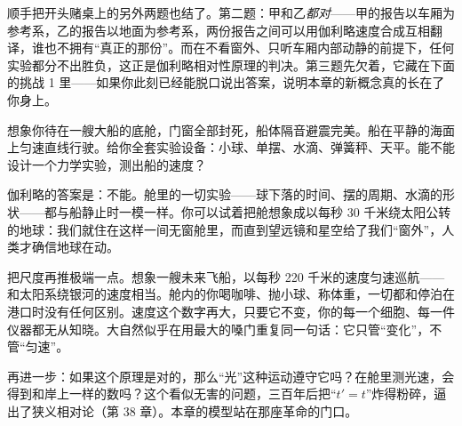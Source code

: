 顺手把开头赌桌上的另外两题也结了。第二题：甲和乙\emph{都对}——甲的报告以车厢为参考系，乙的报告以地面为参考系，两份报告之间可以用伽利略速度合成互相翻译，谁也不拥有“真正的那份”。而在不看窗外、只听车厢内部动静的前提下，任何实验都分不出胜负，这正是伽利略相对性原理的判决。第三题先欠着，它藏在下面的挑战 1 里——如果你此刻已经能脱口说出答案，说明本章的新概念真的长在了你身上。


\begin{thought}[伽利略的无窗船舱]
想象你待在一艘大船的底舱，门窗全部封死，船体隔音避震完美。船在平静的海面上匀速直线行驶。给你全套实验设备：小球、单摆、水滴、弹簧秤、天平。能不能设计一个力学实验，测出船的速度？

伽利略的答案是：不能。舱里的一切实验——球下落的时间、摆的周期、水滴的形状——都与船静止时一模一样。你可以试着把舱想象成以每秒 30 千米绕太阳公转的地球：我们就住在这样一间无窗舱里，而直到望远镜和星空给了我们“窗外”，人类才确信地球在动。

把尺度再推极端一点。想象一艘未来飞船，以每秒 220 千米的速度匀速巡航——和太阳系绕银河的速度相当。舱内的你喝咖啡、抛小球、称体重，一切都和停泊在港口时没有任何区别。速度这个数字再大，只要它不变，你的每一个细胞、每一件仪器都无从知晓。大自然似乎在用最大的嗓门重复同一句话：它只管“变化”，不管“匀速”。

再进一步：如果这个原理是对的，那么“光”这种运动遵守它吗？在舱里测光速，会得到和岸上一样的数吗？这个看似无害的问题，三百年后把“\(t'=t\)”炸得粉碎，逼出了狭义相对论（第 38 章）。本章的模型站在那座革命的门口。
\end{thought}

